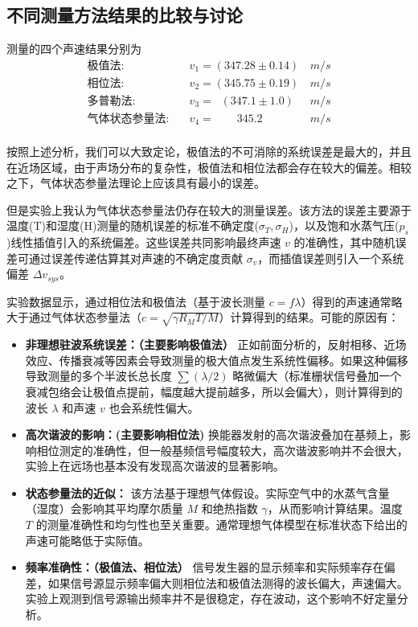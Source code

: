 \documentclass[10pt, twocolumn]{article}
\begin{document}
\subsection{不同测量方法结果的比较与讨论}
测量的四个声速结果分别为
\begin{equation}
    \begin{aligned}
        \text{极值法:}\quad&v_1 = (347.28 \pm 0.14) &\,\si{m/s} \\
        \text{相位法:}\quad&v_2 = (345.75 \pm 0.19) &\,\si{m/s} \\
        \text{多普勒法:}\quad&v_3 = \;\;( 347.1 \pm 1.0) &\,\si{m/s} \\
        \text{气体状态参量法:}\quad&v_4 = \quad \quad 345.2  &\,\si{m/s} \\
    \end{aligned}
\end{equation}
\par
按照上述分析，我们可以大致定论，极值法的不可消除的系统误差是最大的，并且在近场区域，由于声场分布的复杂性，极值法和相位法都会存在较大的偏差。相较之下，气体状态参量法理论上应该具有最小的误差。

\par %
但是实验上我认为气体状态参量法仍存在较大的测量误差。该方法的误差主要源于温度(T)和湿度(H)测量的随机误差的标准不确定度(\(\sigma_T, \sigma_{H}\))，以及饱和水蒸气压(\(p_s\))线性插值引入的系统偏差。这些误差共同影响最终声速 \(v\) 的准确性，其中随机误差可通过误差传递估算其对声速的不确定度贡献 \(\sigma_v\)，而插值误差则引入一个系统偏差 \(\Delta v_{sys}\)。

\par %
实验数据显示，通过相位法和极值法（基于波长测量 $c=f\lambda$）得到的声速通常略大于通过气体状态参量法（$c = \sqrt{\gamma R_M T / M}$）计算得到的结果。可能的原因有：

\begin{itemize}
    \item \textbf{非理想驻波系统误差：（主要影响极值法）} 正如前面分析的，反射相移、近场效应、传播衰减等因素会导致测量的极大值点发生系统性偏移。如果这种偏移导致测量的多个半波长总长度 $\sum (\lambda/2)$ 略微偏大（标准栅状信号叠加一个衰减包络会让极值点提前，幅度越大提前越多，所以会偏大），则计算得到的波长 $\lambda$ 和声速 $v$ 也会系统性偏大。
    \item \textbf{高次谐波的影响：(主要影响相位法)} 换能器发射的高次谐波叠加在基频上，影响相位测定的准确性，但一般基频信号幅度较大，高次谐波影响并不会很大，实验上在远场也基本没有发现高次谐波的显著影响。
    \item \textbf{状态参量法的近似：} 该方法基于理想气体假设。实际空气中的水蒸气含量（湿度）会影响其平均摩尔质量 $M$ 和绝热指数 $\gamma$，从而影响计算结果。温度 $T$ 的测量准确性和均匀性也至关重要。通常理想气体模型在标准状态下给出的声速可能略低于实际值。
    \item \textbf{频率准确性：（极值法、相位法）} 信号发生器的显示频率和实际频率存在偏差，如果信号源显示频率偏大则相位法和极值法测得的波长偏大，声速偏大。实验上观测到信号源输出频率并不是很稳定，存在波动，这个影响不好定量分析。
\end{itemize}
\end{document}
